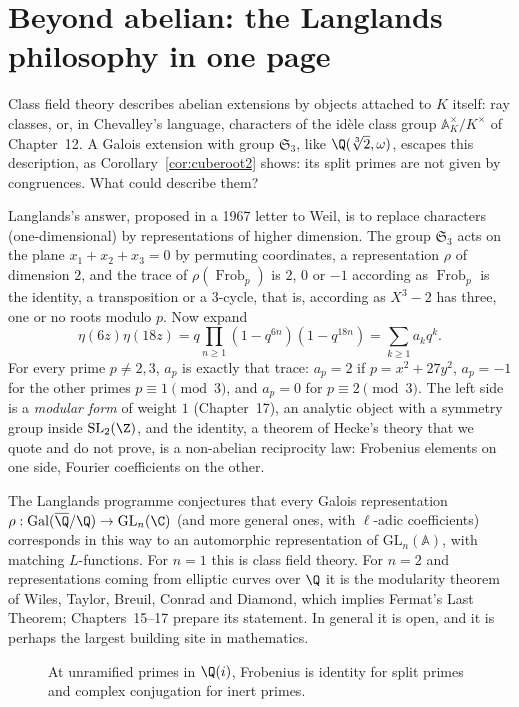 \section{Beyond abelian: the Langlands philosophy in one page}

Class field theory describes abelian extensions by objects attached to $K$ itself: ray classes, or, in Chevalley's language, characters of the id\`ele
class group $\mathbb A_K^\times/K^\times$ of Chapter~12. A Galois extension with group $\mathfrak S_3$, like $\Q(\sqrt[3]2,\omega)$, escapes this description, as
Corollary~\ref{cor:cuberoot2} shows: its split primes are not given by congruences. What could describe them?

Langlands's answer, proposed in a 1967 letter to Weil, is to replace characters (one-dimensional) by representations of higher dimension. The group
$\mathfrak S_3$ acts on the plane $x_1+x_2+x_3=0$ by permuting coordinates, a representation $\rho$ of dimension $2$, and the trace of $\rho(\operatorname{Frob}_p)$ is
$2$, $0$ or $-1$ according as $\operatorname{Frob}_p$ is the identity, a transposition or a $3$-cycle, that is, according as $X^3-2$ has three, one or no roots
modulo $p$. Now expand
\[
\eta(6z)\eta(18z)=q\prod_{n\ge1}(1-q^{6n})(1-q^{18n})=\sum_{k\ge1}a_kq^k.
\]
For every prime $p\ne2,3$, $a_p$ is exactly that trace: $a_p=2$ if $p=x^2+27y^2$, $a_p=-1$ for the other primes $p\equiv1\pmod3$, and $a_p=0$ for $p\equiv2\pmod3$. The left side is a \emph{modular form} of weight $1$ (Chapter~17), an analytic object with a symmetry group inside
$\mathrm{SL}_2(\Z)$, and the identity, a theorem of Hecke's theory that we quote and do not prove, is a non-abelian reciprocity law: Frobenius elements on one side, Fourier
coefficients on the other.

The Langlands programme conjectures that every Galois representation $\rho:\operatorname{Gal}(\overline{\Q}/\Q)\to\mathrm{GL}_n(\C)$ (and more general ones, with
$\ell$-adic coefficients) corresponds in this way to an automorphic representation of $\mathrm{GL}_n(\mathbb A)$, with matching $L$-functions. For $n=1$ this
is class field theory. For $n=2$ and representations coming from elliptic curves over $\Q$ it is the modularity theorem of Wiles, Taylor, Breuil,
Conrad and Diamond, which implies Fermat's Last Theorem; Chapters~15--17 prepare its statement. In general it is open, and it is perhaps the
largest building site in mathematics.

\begin{figure}[ht]
\centering
{}
\caption{At unramified primes in $\Q(i)$, Frobenius is identity for split primes and complex conjugation for inert primes.}
\label{fig:v13-extra-13-a}
\end{figure}

